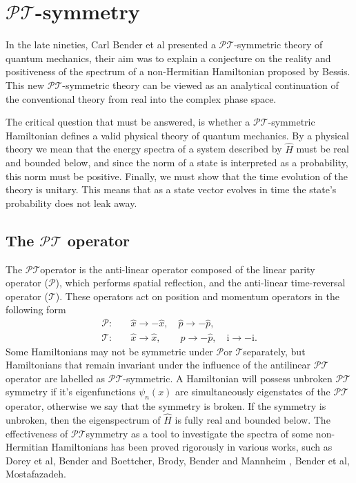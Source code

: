 \documentclass[12pt, a4paper]{report}
\newcommand\PT{\(\mathcal{PT}\)}
\newcommand\PP{\(\mathcal{P}\)}
\newcommand\TT{\(\mathcal{T}\)}
\begin{document}
\section{\texorpdfstring{$\mathcal{PT}$}\:-symmetry}\label{PT}
In the late nineties, Carl Bender et al presented a \PT-symmetric theory of quantum mechanics, their aim was to explain a conjecture on the reality and positiveness of the spectrum of a non-Hermitian Hamiltonian proposed by Bessis\cite{Bender1998}. This new \PT-symmetric theory can be viewed as an analytical continuation of the conventional theory from real into the complex phase space\cite{PT-symmetricQM}.

The critical question that must be answered, is whether a \PT-symmetric Hamiltonian defines a valid physical theory of quantum mechanics. By a physical theory we mean that the energy spectra of a system described by $\hat{H}$ must be real and bounded below, and since the norm of a state is interpreted as a probability, this norm must be positive. Finally, we must show that the time evolution of the theory is unitary. This means that as a state vector evolves in time the state's probability does not leak away\cite{MustaHbeHermitian}\cite{MakingSense}.

\subsection{The \texorpdfstring{$\mathcal{PT}$}\: operator}
The \PT\:operator is the anti-linear operator composed of the linear parity operator (\PP), which performs spatial reflection, and the anti-linear time-reversal operator (\TT). These operators act on position and momentum operators in the following form
\begin{equation}\label{eq:2}
\begin{split}
\mathcal{P}:& \quad\hat{x} \rightarrow -\hat{x},\quad \hat{p} \rightarrow -\hat{p},\\
\mathcal{T}:& \quad\hat{x} \rightarrow \hat{x},\quad\quad \hat{p} \rightarrow -\hat{p},\quad \mathrm{i} \rightarrow -\mathrm{i}.
\end{split}
\end{equation}
Some Hamiltonians may not be symmetric under \PP\:or \TT\:separately, but Hamiltonians that remain invariant under the influence of the antilinear \PT\:operator are labelled as \PT-symmetric. A Hamiltonian will possess unbroken \PT\:symmetry if it's eigenfunctions $\psi_n(x)$ are simultaneously eigenstates of the \PT\: operator, otherwise we say that the symmetry is broken\cite{MakingSense}\cite{ComplexExtension}\cite{MustaHbeHermitian}. If the symmetry is unbroken, then the eigenspectrum of $\hat{H}$ is fully real and bounded below. The effectiveness of \PT\:symmetry as a tool to investigate the spectra of some non-Hermitian Hamiltonians has been proved rigorously in various works, such as Dorey et al\cite{Dorey_2001}, Bender and Boettcher\cite{Bender1998}, Brody\cite{Brody_2016}, Bender and Mannheim \cite{Bender_2010}, Bender et al\cite{PT-symmetricQM}, Mostafazadeh\cite{Mostafazadeh}\cite{Mostafazadeh2}. 
\end{document}
